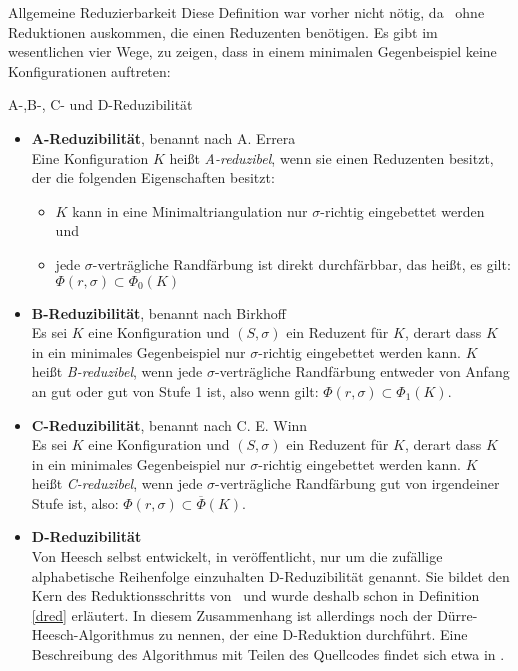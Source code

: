 \begin{section}{Allgemeine Reduzierbarkeit}
 Diese Definition war vorher nicht nötig, da \rsst\-\ ohne Reduktionen auskommen, die einen Reduzenten benötigen. Es gibt im wesentlichen vier Wege, zu zeigen, dass in einem minimalen Gegenbeispiel keine Konfigurationen auftreten:
 
 \begin{definition}{A-,B-, C- und D-Reduzibilität}
 \-\ 
  \begin{itemize}
   \item \textbf{A-Reduzibilität}, benannt nach A. Errera\\
   Eine Konfiguration $K$ heißt \textit{A-reduzibel}, wenn sie einen Reduzenten besitzt, der die folgenden Eigenschaften besitzt:
   \begin{itemize}
    \item $K$ kann in eine Minimaltriangulation nur $\sigma$-richtig eingebettet werden und
    \item jede $\sigma$-verträgliche Randfärbung ist direkt durchfärbbar, das heißt, es gilt: $\Phi(r,\sigma) \subset \Phi_0(K)$
   \end{itemize}
   \item \textbf{B-Reduzibilität}, benannt nach Birkhoff\\
   Es sei $K$ eine Konfiguration und $(S,\sigma)$ ein Reduzent für $K$, derart dass $K$ in ein minimales Gegenbeispiel nur $\sigma$-richtig eingebettet werden kann. $K$ heißt \textit{B-reduzibel}, wenn jede $\sigma$-verträgliche Randfärbung entweder von Anfang an gut oder gut von Stufe 1 ist, also wenn gilt: $\Phi(r,\sigma)\subset\Phi_1(K)$.
   \item \textbf{C-Reduzibilität}, benannt nach C. E. Winn\\
   Es sei $K$ eine Konfiguration und $(S,\sigma)$ ein Reduzent für $K$, derart dass $K$ in ein minimales Gegenbeispiel nur $\sigma$-richtig eingebettet werden kann. $K$ heißt \textit{C-reduzibel}, wenn jede $\sigma$-verträgliche Randfärbung gut von irgendeiner Stufe ist, also: $\Phi(r,\sigma) \subset \overline{\Phi}(K)$.
   \item \textbf{D-Reduzibilität}\\
   Von Heesch selbst entwickelt, in \cite{heesch} veröffentlicht, nur um die zufällige alphabetische Reihenfolge einzuhalten D-Reduzibilität genannt. Sie bildet den Kern  des Reduktionsschritts von \rsst\-\ und wurde deshalb schon in Definition \ref{dred} erläutert. In diesem Zusammenhang ist allerdings noch der Dürre-Heesch-Algorithmus zu nennen, der eine D-Reduktion durchführt. Eine Beschreibung des Algorithmus mit Teilen des Quellcodes findet sich etwa in \cite[Kapitel 6.4]{fritsch}.
  \end{itemize}
 \end{definition}


\end{section}
